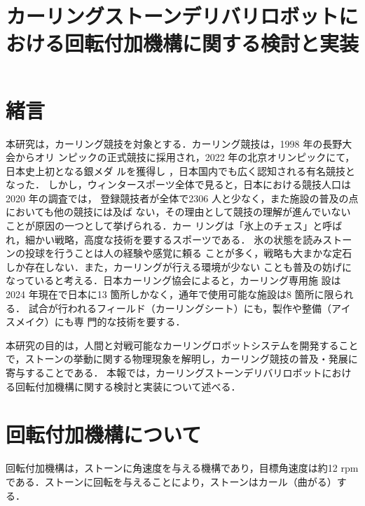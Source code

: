\documentclass{classes/sice-si}
\title{カーリングストーンデリバリロボットにおける回転付加機構に関する検討と実装} %
\begin{document}



\maketitle

\section{緒言}
本研究は，カーリング競技を対象とする．カーリング競技は，1998 年の長野大会からオリ
ンピックの正式競技に採用され，2022 年の北京オリンピックにて，日本史上初となる銀メダ
ルを獲得し ，日本国内でも広く認知される有名競技となった．
しかし，ウィンタースポーツ全体で見ると，日本における競技人口は2020 年の調査では，
登録競技者が全体で2306 人と少なく，また施設の普及の点においても他の競技には及ば
ない，その理由として競技の理解が進んでいないことが原因の一つとして挙げられる．カー
リングは「氷上のチェス」と呼ばれ，細かい戦略，高度な技術を要するスポーツである．
氷の状態を読みストーンの投球を行うことは人の経験や感覚に頼る
ことが多く，戦略も大まかな定石しか存在しない．また，カーリングが行える環境が少ない
ことも普及の妨げになっていると考える．日本カーリング協会によると，カーリング専用施
設は2024 年現在で日本に13 箇所しかなく，通年で使用可能な施設は8 箇所に限られる．
試合が行われるフィールド（カーリングシート）にも，製作や整備（アイスメイク）にも専
門的な技術を要する．

本研究の目的は，人間と対戦可能なカーリングロボットシステムを開発することで，ストーンの挙動に関する物理現象を解明し，カーリング競技の普及・発展に寄与することである．
本報では，カーリングストーンデリバリロボットにおける回転付加機構に関する検討と実装について述べる．
\section{回転付加機構について}
回転付加機構は，ストーンに角速度を与える機構であり，目標角速度は約12 rpmである．ストーンに回転を与えることにより，ストーンはカール（曲がる）する．
\end{document}
